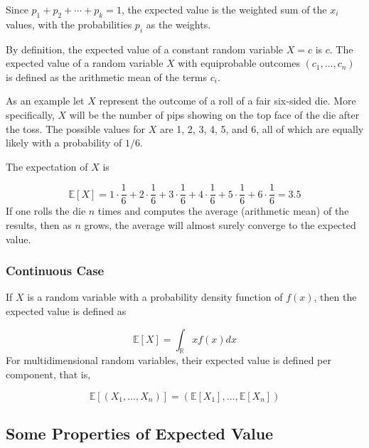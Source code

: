 Since \(p_{1}+p_{2}+\cdots +p_{k}=1\), the expected value is the
weighted sum of the \(x_{i}\) values, with the probabilities \(p_{i}\)
as the weights.

By definition, the expected value of a constant random variable \(X=c\)
is \(c\). The expected value of a random variable \(X\) with
equiprobable outcomes \((c_{1},\ldots ,c_{n})\) is defined as the
arithmetic mean of the terms \(c_i\). 

As an example let \(X\) represent the outcome of a roll of a fair six-sided die. More
specifically, \(X\) will be the number of pips showing on the top face
of the die after the toss. The possible values for \(X\) are 1, 2, 3, 4,
5, and 6, all of which are equally likely with a probability of \(1/6\).

The expectation of \(X\) is

\begin{equation*}
	\mathbb{E}[X]=1\cdot {\frac {1}{6}}+2\cdot {\frac {1}{6}}+3\cdot {\frac {1}{6}}+4\cdot {\frac {1}{6}}+5\cdot {\frac {1}{6}}+6\cdot {\frac {1}{6}}=3.5
\end{equation*}
If one rolls the die \(n\) times and computes the average (arithmetic
mean) of the results, then as \(n\) grows, the average will almost
surely converge to the expected value.

\subsubsection{Continuous Case}
If \(X\) is a random variable with a probability density function of
\(f(x)\), then the expected value is defined as

\begin{equation}
\mathbb{E}[X]=\int _{\mathbb {R} }xf(x)dx
\end{equation}
For multidimensional random variables, their expected value is defined
per component, that is,

\begin{equation}
\mathbb{E}[(X_{1},\ldots ,X_{n})]=(\mathbb{E} [X_{1}],\ldots ,\mathbb{E}[X_{n}])
\end{equation}

\subsection{Some Properties of Expected Value}\label{some-properties}

